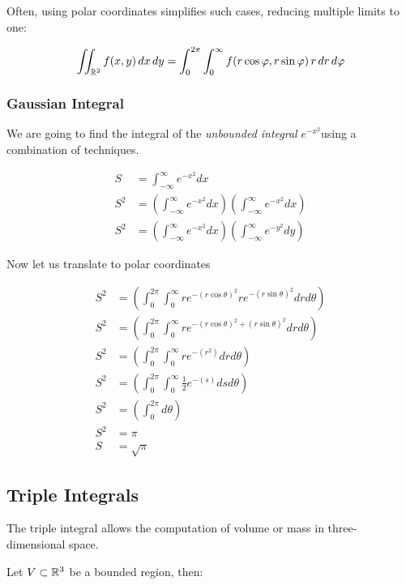 Often, using polar coordinates simplifies such cases, reducing multiple limits to one:

\[
    \iint_{\mathbb{R}^2} f(x, y)\, dx\, dy = \int_0^{2\pi} \int_0^{\infty} f(r \cos \varphi, r \sin \varphi)\, 
    r\, dr\, d\varphi
\]

\subsubsection{Gaussian Integral}

We are going to find the integral of the \emph{unbounded integral} 
\(e^{-x^2}\)using a combination of techniques.

\begin{align*}
    S &= \int_{-\infty}^{\infty} e^{-x^2}dx\\
    S^2 &= \left(\int_{-\infty}^{\infty} e^{-x^2}dx\right) \left(\int_{-\infty}^{\infty} e^{-x^2}dx\right)\\
    S^2 &= \left(\int_{-\infty}^{\infty} e^{-x^2}dx\right) \left(\int_{-\infty}^{\infty} e^{-y^2}dy\right)
\end{align*}

Now let us translate to polar coordinates

\begin{align*}
    S^2 &= \left(\int_{0}^{2\pi} \int_{0}^{\infty}re^{-{(r\cos\theta)}^2} re^{-{(r\sin\theta)}^2}drd\theta\right)\\
    S^2 &= \left(\int_{0}^{2\pi} \int_{0}^{\infty}re^{-{(r\cos\theta)}^2 + {(r\sin\theta)}^2}drd\theta\right)\\
    S^2 &= \left(\int_{0}^{2\pi} \int_{0}^{\infty}re^{-(r^2)}drd\theta\right)\\
    S^2 &=  \left(\int_{0}^{2\pi} \int_{0}^{\infty}\frac{1}{2}e^{-(s)}dsd\theta\right)\\
    S^2 &= \left(\int_{0}^{2\pi}d\theta\right)\\
    S^2 &= \pi\\
    S   &= \sqrt{\pi}
\end{align*}

\QED

\subsection{Triple Integrals}

The triple integral allows the computation of volume or mass in three-dimensional space.

Let \( V \subset \mathbb{R}^3 \) be a bounded region, then:

